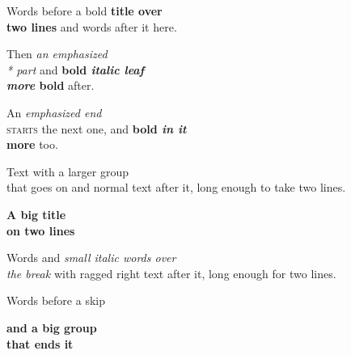 \documentclass{article}
\begin{document}
\begin{titlepage}
\centering
Words before a bold \textbf{title over \\ two lines} and words after it here.
\par
Then \emph{an emphasized\quad{} \\* part} and \textbf{bold \textit{italic leaf\\[4pt] more} bold} after.
\par
An \emph{emphasized end\\} \textsc{starts} the next one, and \textbf{bold \emph{in it\\ } more} too.
\par
Text with a {\large larger group \\[1em] that goes on} and normal text after it, long enough to take two lines.

{\Large\bfseries A big title\\ on two lines\par}
\end{titlepage}
\begin{titlepage}
\raggedright
Words and {\itshape \small small italic words over\\ the break} with ragged right text after it, long enough for two lines.

Words before a skip
\vspace{1cm}
{\Large\bfseries and a big group\\ that ends it\par}
\end{titlepage}
\end{document}
